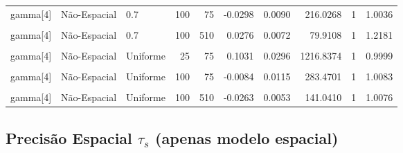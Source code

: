 \documentclass[
]{article}
\begin{document}
\begin{longtable}[t]{lllrrrrrrr}
gamma[4] & Não-Espacial & 0.7 & 100 & 75 & -0.0298 & 0.0090 & 216.0268 & 1 & 1.0036\\
\cmidrule{1-10}\pagebreak[0]
\cellcolor{gray!10}{gamma[4]} & \cellcolor{gray!10}{Espacial} & \cellcolor{gray!10}{0.7} & \cellcolor{gray!10}{100} & \cellcolor{gray!10}{510} & \cellcolor{gray!10}{-0.0497} & \cellcolor{gray!10}{0.0065} & \cellcolor{gray!10}{45.8679} & \cellcolor{gray!10}{1} & \cellcolor{gray!10}{0.9998}\\
\cmidrule{1-10}\pagebreak[0]
gamma[4] & Não-Espacial & 0.7 & 100 & 510 & 0.0276 & 0.0072 & 79.9108 & 1 & 1.2181\\
\cmidrule{1-10}\pagebreak[0]
\cellcolor{gray!10}{gamma[4]} & \cellcolor{gray!10}{Espacial} & \cellcolor{gray!10}{Uniforme} & \cellcolor{gray!10}{25} & \cellcolor{gray!10}{75} & \cellcolor{gray!10}{0.1545} & \cellcolor{gray!10}{0.0472} & \cellcolor{gray!10}{657.5760} & \cellcolor{gray!10}{1} & \cellcolor{gray!10}{1.0000}\\
\cmidrule{1-10}\pagebreak[0]
gamma[4] & Não-Espacial & Uniforme & 25 & 75 & 0.1031 & 0.0296 & 1216.8374 & 1 & 0.9999\\
\cmidrule{1-10}\pagebreak[0]
\cellcolor{gray!10}{gamma[4]} & \cellcolor{gray!10}{Espacial} & \cellcolor{gray!10}{Uniforme} & \cellcolor{gray!10}{100} & \cellcolor{gray!10}{75} & \cellcolor{gray!10}{-0.0142} & \cellcolor{gray!10}{0.0101} & \cellcolor{gray!10}{338.0080} & \cellcolor{gray!10}{1} & \cellcolor{gray!10}{1.0023}\\
\cmidrule{1-10}\pagebreak[0]
gamma[4] & Não-Espacial & Uniforme & 100 & 75 & -0.0084 & 0.0115 & 283.4701 & 1 & 1.0083\\
\cmidrule{1-10}\pagebreak[0]
\cellcolor{gray!10}{gamma[4]} & \cellcolor{gray!10}{Espacial} & \cellcolor{gray!10}{Uniforme} & \cellcolor{gray!10}{100} & \cellcolor{gray!10}{510} & \cellcolor{gray!10}{-0.0277} & \cellcolor{gray!10}{0.0060} & \cellcolor{gray!10}{160.7192} & \cellcolor{gray!10}{1} & \cellcolor{gray!10}{1.0006}\\
\cmidrule{1-10}\pagebreak[0]
gamma[4] & Não-Espacial & Uniforme & 100 & 510 & -0.0263 & 0.0053 & 141.0410 & 1 & 1.0076\\
\bottomrule
\end{longtable}
\endgroup{}

\subsection{\texorpdfstring{Precisão Espacial \(\tau_s\) (apenas modelo
espacial)}{Precisão Espacial \textbackslash tau\_s (apenas modelo espacial)}}\label{precisuxe3o-espacial-tau_s-apenas-modelo-espacial}
\end{document}
